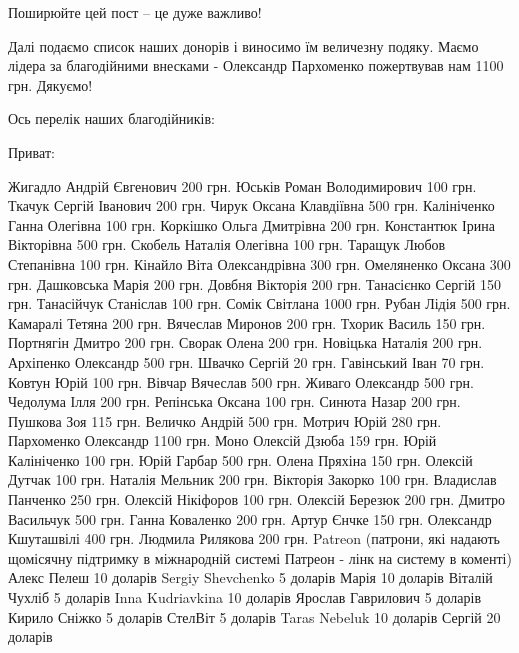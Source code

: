 Поширюйте цей пост – це дуже важливо!

Далі подаємо список наших донорів і виносимо їм величезну подяку. Маємо лідера
за благодійними внесками - Олександр Пархоменко пожертвував нам 1100 грн.
Дякуємо!

Ось перелік наших благодійників:

\raggedcolumns
\begin{multicols}{2} %
\setlength{\parindent}{0pt}

Приват:

\obeycr
Жигадло Андрій Євгенович 200 грн.
Юськів Роман Володимирович 100 грн.
Ткачук Сергій Іванович 200 грн.
Чирук Оксана Клавдіївна 500 грн.
Калініченко Ганна Олегівна 100 грн.
Коркішко Ольга Дмитрівна 200 грн.
Константюк Ірина Вікторівна 500 грн.
Скобель Наталія Олегівна 100 грн.
Таращук Любов Степанівна 100 грн.
Кінайло Віта Олександрівна 300 грн.
Омеляненко Оксана 300 грн.
Дашковська Марія 200 грн.
Довбня Вікторія 200 грн.
Танасієнко Сергій 150 грн.
Танасійчук Станіслав 100 грн.
Сомік Світлана 1000 грн.
Рубан Лідія 500 грн.
Камаралі Тетяна 200 грн.
Вячеслав Миронов 200 грн.
Тхорик Василь 150 грн.
Портнягін Дмитро 200 грн.
Сворак Олена 200 грн.
Новіцька Наталія 200 грн.
Архіпенко Олександр 500 грн.
Швачко Сергій 20 грн.
Гавінський Іван 70 грн.
Ковтун Юрій 100 грн.
Вівчар Вячеслав 500 грн.
Живаго Олександр 500 грн.
Чедолума Ілля 200 грн.
Репінська Оксана 100 грн.
Синюта Назар 200 грн.
Пушкова Зоя 115 грн.
Величко Андрій 500 грн.
Мотрич Юрій    280 грн.
Пархоменко Олександр 1100 грн.
Моно
Олексій Дзюба 159 грн.
Юрій Калініченко 100 грн.
Юрій Гарбар 500 грн.
Олена Пряхіна 150 грн.
Олексій Дутчак 100 грн.
Наталія Мельник 200 грн.
Вікторія Закорко 100 грн.
Владислав Панченко 250 грн.
Олексій Нікіфоров 100 грн.
Олексій Березюк 200 грн.
Дмитро Васильчук   500 грн.
Ганна Коваленко 200 грн.
Артур Єнчке 150 грн.
Олександр Кшуташвілі 400 грн.
Людмила Рилякова 200 грн.
Patreon (патрони, які надають щомісячну підтримку в міжнародній системі Патреон - лінк на систему в коменті)
Алекс Пелеш 10 доларів
Sergiy Shevchenko 5 доларів
Марія 10 доларів
Віталій Чухліб 5 доларів
Inna Kudriavkina 10 доларів
Ярослав Гаврилович 5 доларів
Кирило Сніжко 5 доларів
СтелВіт 5 доларів
Taras Nebeluk 10 доларів
Сергій 20 доларів
\restorecr
\end{multicols} %

